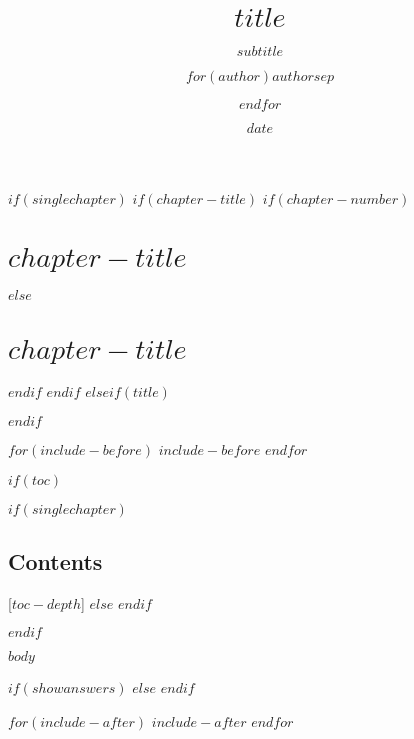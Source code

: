 \documentclass[11pt,oneside]{book}
\title{$title$}
\subtitle{$subtitle$}
\author{$for(author)$$author$$sep$ \and $endfor$}
\date{$date$}
\begin{document}
$if(singlechapter)$
$if(chapter-title)$
$if(chapter-number)$
\setcounter{chapter}{\numexpr $chapter-number$ - 1 \relax}
\chapter{$chapter-title$}
$else$
\chapter*{$chapter-title$}
$endif$
$endif$
$elseif(title)$
\maketitle
$endif$

$for(include-before)$
$include-before$
$endfor$

$if(toc)$
{
$if(singlechapter)$
\section*{Contents}
\startcontents
{}[$toc-depth$]{}
$else$
\setcounter{tocdepth}{$toc-depth$}
\tableofcontents
$endif$
}
$endif$

$body$

$if(showanswers)$
$else$
$endif$

$for(include-after)$
$include-after$
$endfor$
\end{document}

